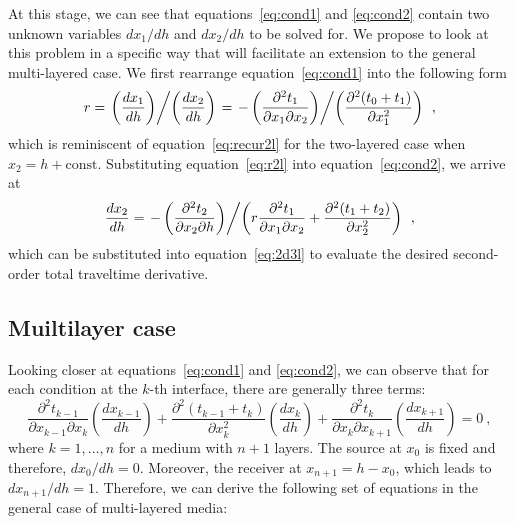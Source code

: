At this stage, we can see that equations~\ref{eq:cond1} and \ref{eq:cond2} contain two unknown variables $dx_1/dh$ and $dx_2/dh$ to be solved for. We propose to look at this problem in a specific way that will facilitate an extension to the general multi-layered case. We first rearrange equation~\ref{eq:cond1} into the following form
 \begin{equation}
 \label{eq:r2l}
 r = \left. \left( \frac{d x_1}{d h}\right) \middle/ \left( \frac{d x_2}{d h}\right)\right. = \left. -\left( \frac{\partial^2 t_1}{\partial x_1 \partial x_2} \right) \middle/ \left( \frac{\partial^2 (t_0 + t_1)}{\partial x_1^2} \right)\right. ~,
 \end{equation}
which is reminiscent of equation~\ref{eq:recur2l} for the two-layered case when $x_2 = h + \text{const}$.  Substituting equation~\ref{eq:r2l} into equation~\ref{eq:cond2}, we arrive at
 \begin{equation}
  \frac{dx_2}{dh} =  \left. -\left( \frac{\partial^2 t_2}{\partial x_2 \partial h} \right) \middle/ \left( r \frac{\partial^2 t_1}{\partial x_1 \partial x_2}  + \frac{\partial^2 (t_1 + t_2)}{\partial x_2^2} \right)\right.  ~,
 \end{equation}
 which can be substituted into equation~\ref{eq:2d3l} to evaluate the desired second-order total traveltime derivative.
 

\subsection{Muiltilayer case}
Looking closer at equations~\ref{eq:cond1} and \ref{eq:cond2}, we can observe that for each condition at the $k$-th interface, there are generally three terms:
\begin{equation}
\frac{\partial^2 t_{k-1}}{\partial x_{k-1} \partial x_k} \left( \frac{d x_{k-1}}{d h}\right) + \frac{\partial^2 (t_{k-1} + t_k)}{\partial x_k^2} \left( \frac{d x_k}{d h}\right) + \frac{\partial^2 t_k}{\partial x_k \partial x_{k+1}}\left( \frac{d x_{k+1}}{d h}\right) = 0~,
\end{equation}
where $k = 1, \dots, n$ for a medium with $n+1$ layers. The source at $x_0$ is fixed and therefore, $dx_0/dh = 0$. Moreover, the receiver at $x_{n+1} = h - x_0$, which leads to $dx_{n+1} /dh = 1$. Therefore, we can derive the following set of equations in the general case of multi-layered media:

